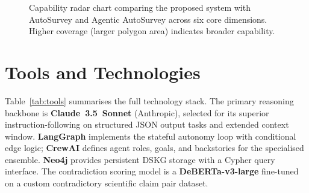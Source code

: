 \documentclass{llncs}
\begin{document}
\begin{figure}[htbp]
\caption{Capability radar chart comparing the proposed system with AutoSurvey
  and Agentic AutoSurvey across six core dimensions. Higher coverage (larger
  polygon area) indicates broader capability.}
\label{fig:radar}
\end{figure}

\section{Tools and Technologies}
\label{sec:tools}

Table~\ref{tab:tools} summarises the full technology stack. The primary
reasoning backbone is \textbf{Claude~3.5~Sonnet} (Anthropic), selected for
its superior instruction-following on structured JSON output tasks and extended
context window. \textbf{LangGraph} implements the stateful autonomy loop with
conditional edge logic; \textbf{CrewAI} defines agent roles, goals, and
backstories for the specialised ensemble. \textbf{Neo4j} provides persistent
DSKG storage with a Cypher query interface. The contradiction scoring model
is a \textbf{DeBERTa-v3-large} fine-tuned on a custom contradictory scientific
claim pair dataset.
\end{document}
